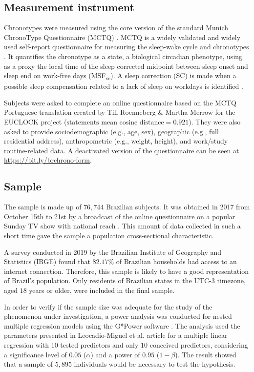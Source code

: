 \documentclass[
12pt,
openright,
oneside,
a4paper,
chapter=TITLE,
section=TITLE,
french,
spanish,
brazil,
english
]{abntex2}\usepackage{array}
\begin{document}
\subsection{Measurement instrument}\label{measurement-instrument}

Chronotypes were measured using the core version of the standard Munich
ChronoType Questionnaire (MCTQ) \autocite{roenneberg2003}. MCTQ is a
widely validated and widely used self-report questionnaire for measuring
the sleep-wake cycle and chronotypes \autocite{roenneberg2019}. It
quantifies the chronotype as a state, a biological circadian phenotype,
using as a proxy the local time of the sleep corrected midpoint between
sleep onset and sleep end on work-free days (MSF\textsubscript{sc}). A
sleep correction (SC) is made when a possible sleep compensation related
to a lack of sleep on workdays is identified \autocite{roenneberg2012}.

Subjects were asked to complete an online questionnaire based on the
MCTQ Portuguese translation created by Till Roenneberg \& Martha Merrow
for the EUCLOCK project \autocite{roenneberg2006}
(\(\text{statements mean cosine distance} = 0.921\)). They were also
asked to provide sociodemographic (e.g., age, sex), geographic (e.g.,
full residential address), anthropometric (e.g., weight, height), and
work/study routine-related data. A deactivated version of the
questionnaire can be seen at \url{https://bit.ly/brchrono-form}.

\subsection{Sample}\label{sample}

The sample is made up of \(76,744\) Brazilian subjects. It was obtained
in 2017 from October 15th to 21st by a broadcast of the online
questionnaire on a popular Sunday TV show with national reach
\autocite{globo2017}. This amount of data collected in such a short time
gave the sample a population cross-sectional characteristic.

A survey conducted in 2019 by the Brazilian Institute of Geography and
Statistics (IBGE) \autocite*{ibge2021} found that \(82.17\%\) of
Brazilian households had access to an internet connection. Therefore,
this sample is likely to have a good representation of Brazil's
population. Only residents of Brazilian states in the UTC-3 timezone,
aged \(18\) years or older, were included in the final sample.

In order to verify if the sample size was adequate for the study of the
phenomenon under investigation, a power analysis was conducted for
nested multiple regression models using the G*Power software
\autocite{faul2007}. The analysis used the parameters presented in
Leocadio-Miguel et al. \autocite*{leocadio-miguel2017} article for a
multiple linear regression with 10 tested predictors and only \(10\)
conceived predictors, considering a significance level of \(0.05\)
(\(\alpha\)) and a power of \(0.95\) (\(1 - \beta\)). The result showed
that a sample of \(5,895\) individuals would be necessary to test the
hypothesis.
\end{document}
